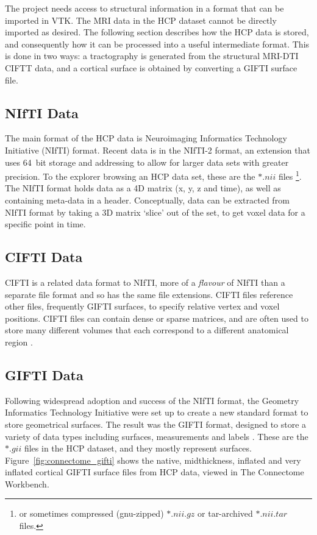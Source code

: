 \documentclass[MSc,paper=a4,pagesize=auto]{icldt}
\begin{document}
The project needs access to structural information in a format that can be imported in VTK. The MRI data in the HCP dataset cannot be directly imported as desired. The following section describes how the HCP data is stored, and consequently how it can be processed into a useful intermediate format. This is done in two ways: a tractography is generated from the structural MRI-DTI CIFTT data, and a cortical surface is obtained by converting a GIFTI surface file. 

\subsection{NIfTI Data}
The main format of the HCP data is Neuroimaging Informatics Technology Initiative (NIfTI) format. Recent data is in the NIfTI-2 format, an extension that uses \SI{64}{bit} storage and addressing to allow for larger data sets with greater precision. To the explorer browsing an HCP data set, these are the $\ast.nii$ files \footnote{or sometimes compressed (gnu-zipped) $\ast.nii.gz$ or tar-archived $\ast.nii.tar$ files.}. The NIfTI format holds data as a 4D matrix (x, y, z and time), as well as containing meta-data in a header. Conceptually, data can be extracted from NIfTI format by taking a 3D matrix `slice' out of the set, to get voxel data for a specific point in time. 

\subsection{CIFTI Data}
CIFTI is a related data format to NIfTI, more of a \textit{flavour} of NIfTI than a separate file format and so has the same file extensions. CIFTI files reference other files, frequently GIFTI surfaces, to specify relative vertex and voxel positions. CIFTI files can contain dense or sparse matrices, and are often used to store many different volumes that each correspond to a different anatomical region \cite{WorkbenchGlossary2014}. 

\subsection{GIFTI Data}
Following widespread adoption and success of the NIfTI format, the Geometry Informatics Technology Initiative were set up to create a new standard format to store geometrical surfaces. The result was the GIFTI format, designed to store a variety of data types including surfaces, measurements and labels \cite{Harwell2011}. These are the $\ast.gii$ files in the HCP dataset, and they mostly represent surfaces. Figure~\ref{fig:connectome_gifti} shows the native, midthickness, inflated and very inflated cortical GIFTI surface files from HCP data, viewed in The Connectome Workbench.
\end{document}
